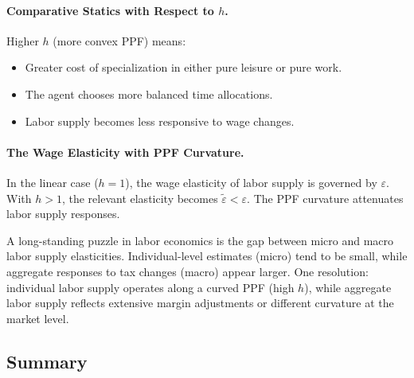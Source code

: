 \paragraph{Comparative Statics with Respect to $h$.}
Higher $h$ (more convex PPF) means:
\begin{itemize}[leftmargin=2em]
\item Greater cost of specialization in either pure leisure or pure work.
\item The agent chooses more balanced time allocations.
\item Labor supply becomes less responsive to wage changes.
\end{itemize}

\paragraph{The Wage Elasticity with PPF Curvature.}
In the linear case ($h = 1$), the wage elasticity of labor supply is governed by $\varepsilon$. With $h > 1$, the relevant elasticity becomes $\tilde{\varepsilon} < \varepsilon$. The PPF curvature attenuates labor supply responses.

\begin{calloutnote}
A long-standing puzzle in labor economics is the gap between micro and macro labor supply elasticities. Individual-level estimates (micro) tend to be small, while aggregate responses to tax changes (macro) appear larger. One resolution: individual labor supply operates along a curved PPF (high $h$), while aggregate labor supply reflects extensive margin adjustments or different curvature at the market level.
\end{calloutnote}

\subsection{Summary}
\label{subsec:labor-ppf-summary}

